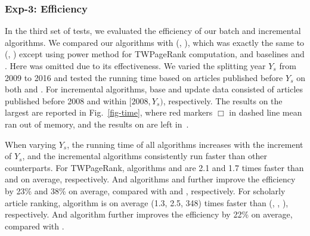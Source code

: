 \subsubsection{Exp-3: Efficiency}
In the third set of tests, we evaluated the efficiency of our batch and incremental algorithms.
We compared our algorithms with \powensemble (\powtwprdag, \powtwprscc), which was exactly the same to \batensemble (\twprdag, \twprscc) except using power method for TWPageRank computation, and baselines \futurerank and \hhgrank. Here \pagerank was omitted due to its effectiveness.
We varied the splitting year $Y_s$ from 2009 to 2016 and tested the running time based on articles published before $Y_s$ on both \magdata and \aminer. %
For incremental algorithms, base and update data consisted of articles published before 2008 and within $[2008, Y_s)$, respectively.
The results on the largest \magdata are reported in Fig.~\ref{fig-time}, where red markers $\Box$ in dashed line mean \hhgrank ran out of memory, and the results on \aminer are left in~\cite{ERank-full}.

When varying $Y_s$, the running time of all algorithms increases with the increment of $Y_s$, and the incremental algorithms
consistently run faster than other counterparts.
For TWPageRank, algorithms \twprdag and \twprscc
are 2.1 and 1.7 times faster than \powtwprdag and \powtwprscc on average, respectively. And algorithms \inctwprdag and \inctwprscc further improve the efficiency  by 23\% and 38\% on average, compared with \twprdag and \twprscc, respectively.
%
For scholarly article ranking, algorithm \batensemble is on average (1.3, 2.5, 348) times faster than (\powensemble, \futurerank, \hhgrank), respectively.
And algorithm \incensemble further improves the efficiency by 22\% on average, compared with \batensemble.




